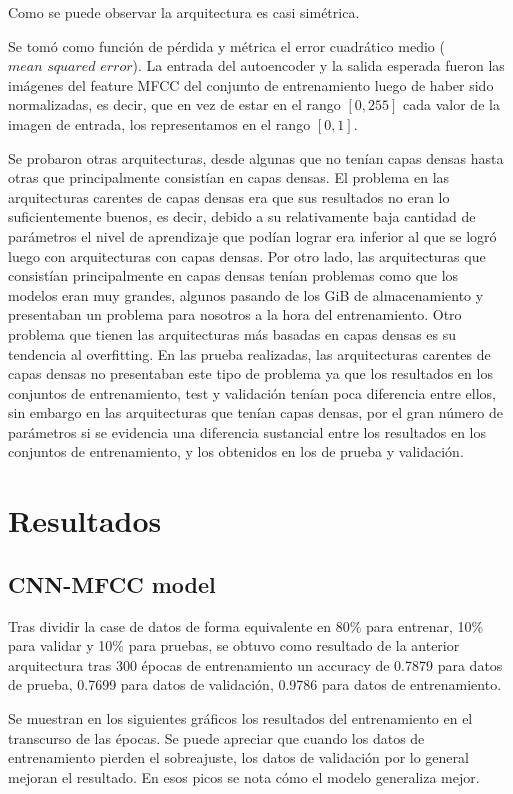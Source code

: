\documentclass[colorinlistoftodos,twoside,twocolumn,10pt]{article} %
\begin{document}
Como se puede observar la arquitectura es casi sim\'etrica.

Se tom\'o como funci\'on de p\'erdida y m\'etrica el error cuadr\'atico medio ($\textit{mean squared error}$). La entrada del autoencoder y la salida esperada fueron las im\'agenes del feature MFCC del conjunto de entrenamiento luego de haber sido normalizadas, es decir, que en vez de estar en el rango $[0, 255]$ cada valor de la imagen de entrada, los representamos en el rango $[0, 1]$. 

Se probaron otras arquitecturas, desde algunas que no ten\'ian capas densas hasta otras que principalmente consist\'ian en capas densas. El problema en las arquitecturas carentes de capas densas era que sus resultados no eran lo suficientemente buenos, es decir, debido a su relativamente baja cantidad de par\'ametros el nivel de aprendizaje que pod\'ian lograr era inferior al que se logr\'o luego con arquitecturas con capas densas. Por otro lado, las arquitecturas que consist\'ian principalmente en capas densas ten\'ian problemas como que los modelos eran muy grandes, algunos pasando de los GiB de almacenamiento y presentaban un problema para nosotros a la hora del entrenamiento. Otro problema que tienen las arquitecturas m\'as basadas en capas densas es su tendencia al overfitting. En las prueba realizadas, las arquitecturas carentes de capas densas no presentaban este tipo de problema ya que los resultados en los conjuntos de entrenamiento, test y validaci\'on ten\'ian poca diferencia entre ellos, sin embargo en las arquitecturas que ten\'ian capas densas, por el gran n\'umero de par\'ametros si se evidencia una diferencia sustancial entre los resultados en los conjuntos de entrenamiento, y los obtenidos en los de prueba y validaci\'on. 


\section{Resultados}
\subsection {CNN-MFCC model}
Tras dividir la case de datos de forma equivalente en 80\% para entrenar, 10\% para validar y 10\% para pruebas, se obtuvo como resultado de la anterior arquitectura tras 300 \'epocas de entrenamiento un accuracy de 0.7879 para datos de prueba, 0.7699 para datos de validaci\'on, 0.9786 para datos de entrenamiento.

Se muestran en los siguientes gr\'aficos los resultados del entrenamiento en el transcurso de las \'epocas. Se puede apreciar que cuando los datos de entrenamiento pierden el sobreajuste, los datos de validaci\'on por lo general mejoran el resultado. En esos picos se nota c\'omo el modelo generaliza mejor.
\end{document}
